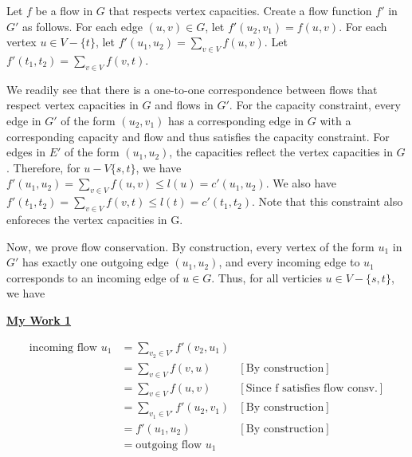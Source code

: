\documentclass[12pt]{article}
\begin{document}
\begin{enumerate}[1.]
\begin{enumerate}[a)]
        Let $f$ be a flow in $G$ that respects vertex capacities. Create a flow function
        $f'$ in $G'$ as follows. For each edge $(u,v) \in G$, let $f'(u_2, v_1) = f(u,v)$.
        For each vertex $u \in V - \{t\}$, let $f'(u_1, u_2) = \sum\limits_{v \in V} f(u,v)$.
        Let $f'(t_1, t_2) = \sum\limits_{v \in V} f(v,t)$.

        \bigskip

        We readily see that there is a one-to-one correspondence between flows that respect
        vertex capacities in $G$ and flows in $G'$. For the capacity constraint, every edge
        in $G'$ of the form $(u_2, v_1)$ has a corresponding edge in $G$ with a corresponding
        capacity and flow and thus satisfies the capacity constraint. For edges in $E'$ of
        the form $(u_1, u_2)$, the capacities reflect the vertex capacities in $G$. Therefore,
        for $u - V \{s,t\}$, we have $f'(u_1, u_2) = \sum\limits_{v \in V} f(u,v) \leq l(u) = c'(u_1, u_2)$.
        We also have $f'(t_1, t_2) = \sum\limits_{v \in V} f(v,t) \leq l(t) = c'(t_1, t_2)$. Note
        that this constraint also enforeces the vertex capacities in G.

        \bigskip

        Now, we prove flow conservation. By construction, every vertex of the form $u_1$
        in $G'$ has exactly one outgoing edge $(u_1, u_2)$, and every incoming edge to $u_1$
        corresponds to an incoming edge of $u \in G$. Thus, for all verticies $u \in V - \{s,t\}$,
        we have

        \bigskip

        \begin{mdframed}
        \underline{\textbf{My Work 1}}

        \bigskip

        \begin{align}
        \text{incoming flow $u_1$} &= \sum\limits_{v_2 \in V'} f'(v_2, u_1)\\
        &= \sum\limits_{v \in V} f(v,u) & [\text{By construction}]\\
        &= \sum\limits_{v \in V} f(u,v) & [\text{Since f satisfies flow consv.}]\\
        &= \sum\limits_{v_1 \in V'} f'(u_2,v_1) & [\text{By construction}]\\
        &= f'(u_1,u_2) & [\text{By construction}]\\
        &= \text{outgoing flow $u_1$}
        \end{align}


\end{mdframed}
\end{enumerate}
\end{enumerate}
\end{document}

